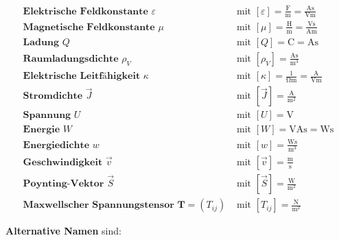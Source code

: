 \begin{minipage}{\textwidth}
{\begin{align}
	    \textbf{Elektrische Feldkonstante }\varepsilon & \text{ mit }\left[\varepsilon\right] =\mathrm{ \frac{F}{m} = \frac{A s}{V m} }      \\
	    \textbf{Magnetische Feldkonstante }\mu         & \text{ mit }\left[\mu\right] =\mathrm{ \frac{H}{m} = \frac{V s}{A m} }              \\
	    \textbf{Ladung }Q                              & \text{ mit }\left[Q\right] =\mathrm{ C = A s}                                       \\
	    \textbf{Raumladungsdichte }\rho_{V}            & \text{ mit }\left[\rho_{V}\right] =\mathrm{ \frac{A s}{m^{3}} }                     \\
	    \textbf{Elektrische Leitfähigkeit }\kappa      & \text{ mit }\left[\kappa\right] =\mathrm{ \frac{1}{\Omega m} = \frac{A}{V m}}       \\
	    \textbf{Stromdichte }\vec{J}                   & \text{ mit }\left[\vec{J}\right] =\mathrm{ \frac{A}{m^{2}} }                        \\
	    \textbf{Spannung } U                           & \text{ mit }\left[U\right] =\mathrm{ V}                                             \\
	    \textbf{Energie } W                            & \text{ mit }\left[W\right] =\mathrm{ VAs = Ws}                                      \\
	    \textbf{Energiedichte } w                      & \text{ mit }\left[w\right] =\mathrm{ \frac{Ws}{m^3}}                                \\
	    \textbf{Geschwindigkeit } \vec{v}              & \text{ mit }\left[\vec{v}\right] =\mathrm{ \frac{m}{s}}\\
	    \textbf{Poynting-Vektor } \vec{S}              & \text{ mit }\left[\vec{S}\right] =\mathrm{ \frac{W}{m^2}}\\
	    \textbf{Maxwellscher Spannungstensor } \mathbf{T}=(T_{ij})              & \text{ mit }[T_{ij}] = \mathrm{\frac{N}{m^2}}
    \end{align}
   }
\end{minipage}
\newpage
  \textbf{Alternative Namen} sind:
